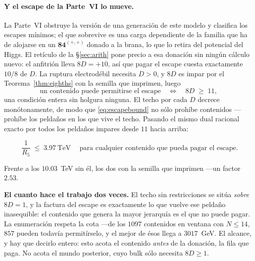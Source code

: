\documentclass[11pt,a4paper]{article}
\newcommand{\rep}[1]{\mathbf{#1}}
\newenvironment{keyeq}
  {\begin{center}\setlength{\fboxsep}{9pt}\setlength{\fboxrule}{0.8pt}%
   \begin{lrbox}{\keyeqbox}\begin{minipage}{0.88\textwidth}}
  {\end{minipage}\end{lrbox}%
   \fcolorbox{hdrblue!55}{hdrblue!6}{\usebox{\keyeqbox}}\end{center}}
\begin{document}
\paragraph{Y el escape de la Parte~VI lo mueve.} La Parte~VI \cite{PartVI} obstruye la versión de una
generación de este modelo y clasifica los escapes mínimos; el que sobrevive es una carga dependiente
de la familia que ha de alojarse en un $\rep{84}^{(+,+)}$ donado a la brana, lo que lo retira del
potencial del Higgs. El retículo de la \S\ref{sec:arith} pone precio a esa donación sin ningún
cálculo nuevo: el anfitrión lleva $8D=+10$, así que pagar el escape cuesta exactamente $10/8$ de
$D$. La ruptura electrodébil necesita $D>0$, y $8D$ es impar por el Teorema~\ref{thm:eighths} con la
semilla que \cite{KM25} imprimen, luego
\begin{equation}\label{eq:escapebound}
  \text{un contenido puede permitirse el escape}\quad\Longleftrightarrow\quad 8D\;\ge\;11 ,
\end{equation}
una condición entera sin holgura ninguna. El techo por cada $D$ decrece monótonamente, de modo que
\eqref{eq:escapebound} no sólo prohíbe contenidos ---prohíbe los peldaños en los que vive el techo.
Pasando el mismo dual racional exacto por todos los peldaños impares desde $11$ hacia arriba:
\begin{keyeq}
\begin{equation}\label{eq:escapeceiling}
  \boxed{\;\frac{1}{R_5}\;\le\;3.97\ \text{TeV}\;}
  \quad\text{para cualquier contenido que pueda pagar el escape.}
\end{equation}
\end{keyeq}
\noindent Frente a los $10.03$~TeV sin él, los dos con la semilla que \cite{KM25} imprimen ---un factor $2.53$.

\noindent\textbf{El cuanto hace el trabajo dos veces.} El techo sin restricciones se sitúa
\emph{sobre} $8D=1$, y la factura del escape es exactamente lo que vuelve ese peldaño inasequible:
el contenido que genera la mayor jerarquía es el que no puede pagar. La enumeración respeta la cota
---de los $1097$ contenidos en ventana con $N\le14$, $857$ pueden todavía permitírselo, y el mejor de
ésos llega a $3017$~GeV. El alcance, y hay que decirlo entero: esto acota el contenido \emph{antes}
de la donación, la fila que paga. No acota el mundo posterior, cuyo bulk sólo necesita $8D\ge1$.
\end{document}
